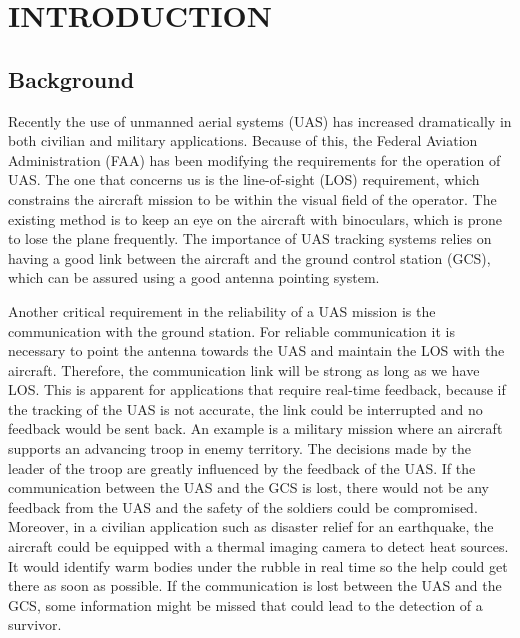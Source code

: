 \chapter{INTRODUCTION}
\label{ch:introduction}

\section{Background}
Recently the use of unmanned aerial systems (UAS) has increased dramatically in both civilian and military applications. Because of this, the Federal Aviation Administration (FAA) has been modifying the requirements for the operation of UAS. The one that concerns us is the line-of-sight (LOS) requirement, which constrains the aircraft mission to be within the visual field of the operator. The existing method is to keep an eye on the aircraft with binoculars, which is prone to lose the plane frequently. The importance of UAS tracking systems relies on having a good link between the aircraft and the ground control station (GCS), which can be assured using a good antenna pointing system.

Another critical requirement in the reliability of a UAS mission is the communication with the ground station. For reliable communication it is necessary to point the antenna towards the UAS and maintain the LOS with the aircraft. Therefore, the communication link will be strong as long as we have LOS. This is apparent for applications that require real-time feedback, because if the tracking of the UAS is not accurate, the link could be interrupted and no feedback would be sent back. An example is a military mission where an aircraft supports an advancing troop in enemy territory.  The decisions made by the leader of the troop are greatly influenced by the feedback of the UAS. If the communication between the UAS and the GCS is lost, there would not be any feedback from the UAS and the safety of the soldiers could be compromised. Moreover, in a civilian application such as disaster relief for an earthquake, the aircraft could be equipped with a thermal imaging camera to detect heat sources. It would identify warm bodies under the rubble in real time so the help could get there as soon as possible. If the communication is lost between the UAS and the GCS, some information might be missed that could lead to the detection of a survivor.

